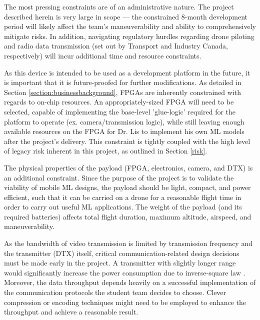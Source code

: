 The most pressing constraints are of an administrative nature. The project described
herein is very large in scope --- the constrained 8-month development period 
will likely affect the team's maneuverability and ability to comprehensively mitigate risks. 
In addition, navigating regulatory hurdles regarding drone piloting and radio data transmission (set out by 
Transport and Industry Canada, respectively) will incur additional time and resource constraints.  

As this device is intended to be used as a development platform in the future, it is important that it is future-proofed for further modifications. As detailed in Section \ref{section:businessbackground}, FPGAs are
inherently constrained with regards to on-chip resources. An appropriately-sized FPGA will need to be selected, capable of
implementing the base-level 'glue-logic' required for the platform to operate (ex. camera/transmission logic), while still 
leaving enough available resources on the FPGA for Dr. Lis to implement his own ML models after the project's delivery. 
This constraint is tightly coupled with the high level of legacy risk inherent in this project, as outlined in Section \ref{risk}.

The physical properties of the payload (FPGA, electronics, camera, and  DTX) is an additional constraint. Since the purpose of the project
is to validate the viability of mobile ML designs, the payload should be light, compact, and power efficient, such
that it can be carried on a drone for a reasonable flight time in order to carry out useful ML applications.
The weight of the payload (and its required batteries) affects total flight duration, maximum altitude, airspeed, and maneuverability. 

As the bandwidth of video transmission is limited by transmission frequency and the transmitter (DTX) itself, 
critical communication-related design decisions must be made early in the project.
A transmitter with slightly longer range would significantly increase the power consumption due to inverse-square law \cite{wiki-inverse-square}.
Moreover, the data throughput depends heavily on a successful implementation of the communication
protocols the student team decides to choose. Clever compression or encoding techniques might need to be
employed to enhance the throughput and achieve a reasonable result.


